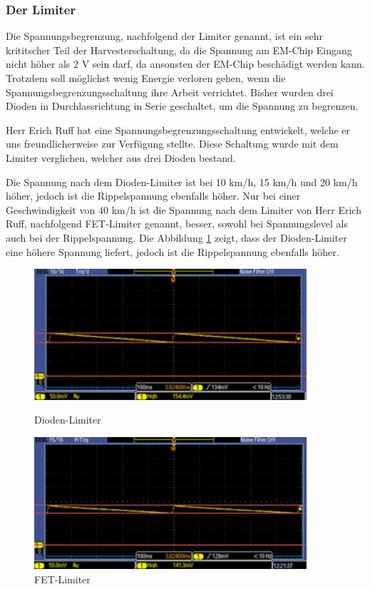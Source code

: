 \subsubsection{Der Limiter}

Die Spannungsbegrenzung, nachfolgend der Limiter genannt, ist ein sehr krititscher Teil der Harvesterschaltung, da die Spannung am EM-Chip Eingang nicht höher als 2 V sein darf, da ansonsten der EM-Chip beschädigt werden kann. Trotzdem soll möglichst wenig Energie verloren gehen, wenn die Spannungsbegrenzungsschaltung ihre Arbeit verrichtet. Bisher wurden drei Dioden in Durchlassrichtung in Serie geschaltet, um die Spannung zu begrenzen.

Herr Erich Ruff hat eine Spannungsbegrenzungsschaltung entwickelt, welche er uns freundlicherweise zur Verfügung stellte. Diese Schaltung wurde mit dem Limiter verglichen, welcher aus drei Dioden bestand.

Die Spannung nach dem Dioden-Limiter ist bei 10 km/h, 15 km/h und 20 km/h höher, jedoch ist die Rippelspannung ebenfalls höher. Nur bei einer Geschwindigkeit von 40 km/h ist die Spannung nach dem Limiter von Herr Erich Ruff, nachfolgend FET-Limiter genannt, besser, sowohl bei Spannungslevel als auch bei der Rippelspannung. Die Abbildung \ref{messung_optimierung_limiter} zeigt, dass der Dioden-Limiter eine höhere Spannung liefert, jedoch ist die Rippelspannung ebenfalls höher.

\begin{figure}[ht]
 \begin{minipage}[t]{0.5\textwidth}
    \includegraphics[width=0.9\textwidth]{3Vorgehen/imag/Messung_Optimierung_Limiter_links.png}
    \caption{Dioden-Limiter}
    \label{messung_optimierung_limiter} 
 \end{minipage}
 \begin{minipage}[t]{0.5\textwidth}
    \includegraphics[width=0.9\textwidth]{3Vorgehen/imag/Messung_Optimierung_Limiter_rechts.png}
    \caption{FET-Limiter}
 \end{minipage}
\end{figure}

